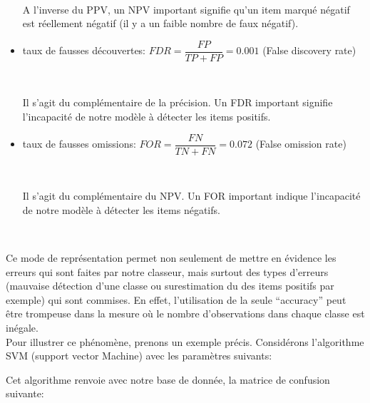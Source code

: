 \documentclass[a4paper]{report}
\begin{document}
\begin{itemize}
~\par

A l'inverse du PPV, un NPV important signifie qu'un item marqué négatif est réellement négatif (il y a un faible nombre de faux négatif).


\item taux de fausses découvertes: $FDR=\dfrac{FP}{TP+FP}=0.001$   (False discovery rate)

~\par

Il s'agit du complémentaire de la précision. Un FDR important signifie l'incapacité de notre modèle à détecter les items positifs. 

\item taux de fausses omissions: $FOR=\dfrac{FN}{TN+FN}=0.072$ (False omission rate)

~\par

Il s'agit du complémentaire du NPV. Un FOR important indique l'incapacité de notre modèle à détecter les items négatifs. 

\end{itemize}

~\par


Ce mode de représentation permet non seulement de mettre en évidence les erreurs qui sont faites par notre classeur, mais surtout des types d'erreurs (mauvaise détection d'une classe ou surestimation du des items positifs par exemple) qui sont commises. En effet, l'utilisation de la seule “accuracy” peut être trompeuse dans la mesure où le nombre d'observations dans chaque classe est inégale. \\
\medskip
Pour illustrer ce phénomène, prenons un exemple précis. Considérons l'algorithme SVM (support vector Machine) avec les paramètres suivants:
\medbreak

\begin{center}
\noindent
{}
\end{center}
\medbreak
Cet algorithme renvoie avec notre base de donnée, la matrice de confusion suivante: 
\end{document}
